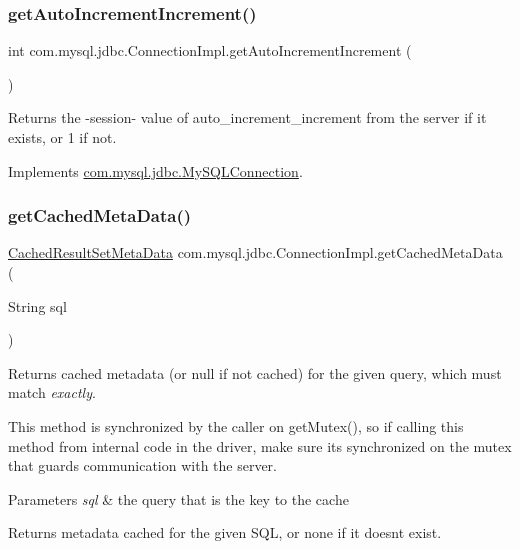 \subsubsection{\texorpdfstring{get\+Auto\+Increment\+Increment()}{getAutoIncrementIncrement()}}
{\footnotesize\ttfamily int com.\+mysql.\+jdbc.\+Connection\+Impl.\+get\+Auto\+Increment\+Increment (\begin{DoxyParamCaption}{ }\end{DoxyParamCaption})}

Returns the -\/session-\/ value of \textquotesingle{}auto\+\_\+increment\+\_\+increment\textquotesingle{} from the server if it exists, or \textquotesingle{}1\textquotesingle{} if not. 

Implements \mbox{\hyperlink{interfacecom_1_1mysql_1_1jdbc_1_1_my_s_q_l_connection_acb6ababcad41a91c6a44d300d09acff9}{com.\+mysql.\+jdbc.\+My\+S\+Q\+L\+Connection}}.

\mbox{\label{classcom_1_1mysql_1_1jdbc_1_1_connection_impl_a705925b76b3f0c60f84c8dd8b19db331}} 
\subsubsection{\texorpdfstring{get\+Cached\+Meta\+Data()}{getCachedMetaData()}}
{\footnotesize\ttfamily \mbox{\hyperlink{classcom_1_1mysql_1_1jdbc_1_1_cached_result_set_meta_data}{Cached\+Result\+Set\+Meta\+Data}} com.\+mysql.\+jdbc.\+Connection\+Impl.\+get\+Cached\+Meta\+Data (\begin{DoxyParamCaption}\item[{String}]{sql }\end{DoxyParamCaption})}

Returns cached metadata (or null if not cached) for the given query, which must match {\itshape exactly}.

This method is synchronized by the caller on get\+Mutex(), so if calling this method from internal code in the driver, make sure it\textquotesingle{}s synchronized on the mutex that guards communication with the server.


\begin{DoxyParams}{Parameters}
{\em sql} & the query that is the key to the cache\\
\hline
\end{DoxyParams}
\begin{DoxyReturn}{Returns}
metadata cached for the given S\+QL, or none if it doesn\textquotesingle{}t exist. 
\end{DoxyReturn}


